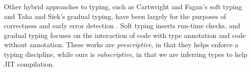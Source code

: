 Other hybrid approaches to typing, such as Cartwright and Fagan's soft typing
and Taha and Siek's gradual typing, have been largely for the purposes of
correctness and early error detection \cite{Cartwright91,
  Siek07}. Soft typing inserts run-time checks, and gradual typing focuses on
the interaction of code with type annotation and code without
annotation. These works are \emph{prescriptive}, in that they helps enforce a
typing discipline, while ours is \emph{subscriptive}, in that we are inferring
types to help JIT compilation.



